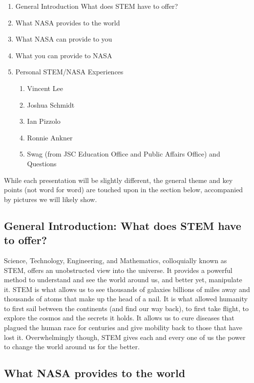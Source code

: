 \documentclass{article}
\let\Oldsubsection\subsection
\renewcommand{\subsection}{\FloatBarrier\Oldsubsection}
\begin{document}
\begin{enumerate}
\item General Introduction What does STEM have to offer?
\item What NASA provides to the world
\item What NASA can provide to you
\item What you can provide to NASA
\item Personal STEM/NASA Experiences
\begin{enumerate}
\item Vincent Lee
\item Joshua Schmidt
\item Ian Pizzolo
\item Ronnie Ankner
\item Swag (from JSC Education Office and Public Affairs Office) and Questions
\end{enumerate}
\end{enumerate}

While each presentation will be slightly different, the general theme and key points (not word for word) are touched upon in the section below, accompanied by pictures we will likely show.

\subsection{General Introduction: What does STEM have to offer?}

Science, Technology, Engineering, and Mathematics, colloquially known as STEM, offers an unobstructed view into the universe. It provides a powerful method to understand and see the world around us, and better yet, manipulate it. STEM is what allows us to see thousands of galaxies billions of miles away and thousands of atoms that make up the head of a nail. It is what allowed humanity to first sail between the continents (and find our way back), to first take flight, to explore the cosmos and the secrets it holds. It allows us to cure diseases that plagued the human race  for centuries and give mobility back to those that have lost it. Overwhelmingly  though, STEM gives each and every one of us the power to change the world around us for the better.

\subsection{What NASA provides to the world}
\end{document}
